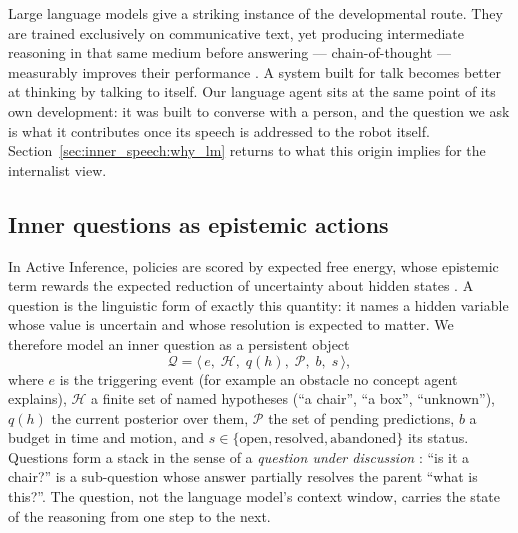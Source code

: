 Large language models give a striking instance of the developmental route. They are trained exclusively on
communicative text, yet producing intermediate reasoning in that same medium before answering --- chain-of-thought
--- measurably improves their performance \cite{wei2022chain}. A system built for talk becomes better at thinking
by talking to itself. Our language agent sits at the same point of its own development: it was built to converse
with a person, and the question we ask is what it contributes once its speech is addressed to the robot itself.
Section~\ref{sec:inner_speech:why_lm} returns to what this origin implies for the internalist view.

\subsection{Inner questions as epistemic actions}
\label{sec:inner_speech:questions}

In Active Inference, policies are scored by expected free energy, whose epistemic term rewards the expected
reduction of uncertainty about hidden states \cite{friston2017process, parr2022active}. A question is the
linguistic form of exactly this quantity: it names a hidden variable whose value is uncertain and whose resolution
is expected to matter. We therefore model an inner question as a persistent object
\begin{equation}
    \mathcal{Q} = \big\langle\, e,\; \mathcal{H},\; q(h),\; \mathcal{P},\; b,\; s \,\big\rangle ,
    \label{eq:inner_question}
\end{equation}
where $e$ is the triggering event (for example an obstacle no concept agent explains), $\mathcal{H}$ a finite set
of named hypotheses (``a chair'', ``a box'', ``unknown''), $q(h)$ the current posterior over them, $\mathcal{P}$
the set of pending predictions, $b$ a budget in time and motion, and $s \in \{\text{open},\text{resolved},
\text{abandoned}\}$ its status. Questions form a stack in the sense of a \emph{question under discussion}
\cite{roberts2012information}: ``is it a chair?'' is a sub-question whose answer partially resolves the parent
``what is this?''. The question, not the language model's context window, carries the state of the reasoning from
one step to the next.


